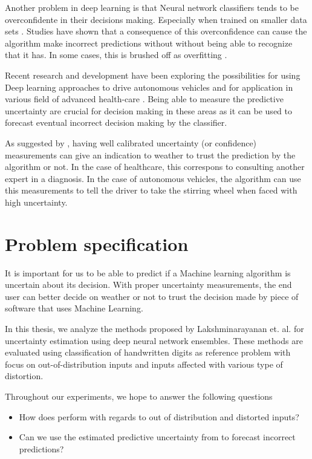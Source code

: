 Another problem in deep learning is that Neural network classifiers tends to be overconfidente in their decisions making\cite{lakshminarayanan2017simple}. Especially when trained on smaller data sets \cite{amodei2016concrete}. Studies have shown that a consequence of this overconfidence can cause the algorithm make incorrect predictions without\cite{nguyen2015deep} without being able to recognize that it has. In some cases, this is brushed off as overfitting \cite{goodfellow2014generative}.

Recent research and development have been exploring the possibilities for using Deep learning approaches to drive autonomous vehicles \cite{bojarski2016end,tian2018deeptest} and for application in various field of advanced health-care \cite{miotto2017deep}. Being able to measure the predictive uncertainty are crucial for decision making in these areas as it can be used to forecast eventual incorrect decision making by the classifier. 

As suggested by \cite{mandelbaum2017distance}, having well calibrated uncertainty (or confidence) measurements can give an indication to weather to trust the prediction by the algorithm or not. In the case of healthcare, this correspons to consulting another expert in a diagnosis. In the case of autonomous vehicles, the algorithm can use this measurements to tell the driver to take the stirring wheel when faced with high uncertainty.

\section{Problem specification}
\label{sect:probspec}

It is important for us to be able to predict if a Machine learning algorithm is uncertain about its decision. With proper uncertainty measurements, the end user can better decide on weather or not to trust the decision made by piece of software that uses Machine Learning.

In this thesis, we analyze the methods proposed by Lakshminarayanan et. al.\cite{lakshminarayanan2017simple} for uncertainty estimation using deep neural network ensembles. These methods are evaluated using classification of handwritten digits as reference problem with focus on out-of-distribution inputs and inputs affected with various type of distortion.

Throughout our experiments, we hope to answer the following questions
\begin{itemize}
    \item How does \cite{lakshminarayanan2017simple} perform with regards to out of distribution and distorted inputs?
    \item Can we use the estimated predictive uncertainty from \cite{lakshminarayanan2017simple} to forecast incorrect predictions?
\end{itemize}

